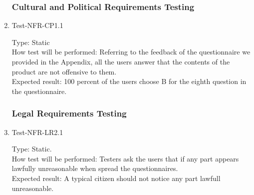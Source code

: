 \documentclass[12pt, titlepage]{article}
\begin{document}
\begin{enumerate}
\subsubsection{Cultural and Political Requirements Testing}

\item{Test-NFR-CP1.1\\}

Type: Static\\

How test will be performed: Referring to the feedback of the questionnaire we provided in the Appendix, all the users answer that the contents of the product are not offensive to them.\\

Expected result: 100 percent of the users choose B for the eighth question in the questionnaire.


\subsubsection{Legal Requirements Testing}

\item{Test-NFR-LR2.1\\}

Type: Static.\\

How test will be performed: Testers ask the users that if any part appears lawfully unreasonable when spread the questionnaires.\\

Expected result: A typical citizen should not notice any part lawfull unreasonable. 
\end{enumerate}
\end{document}
